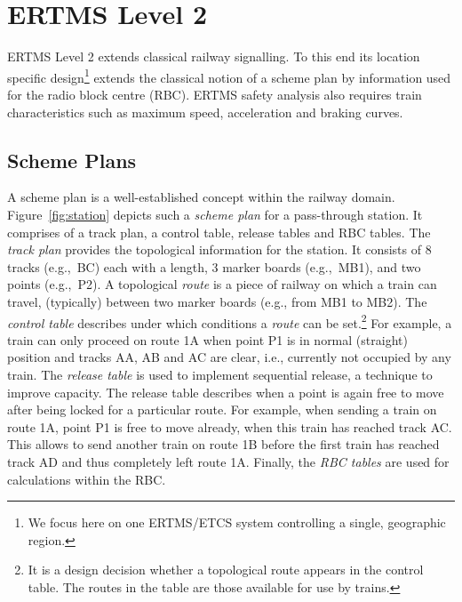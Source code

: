 \section{ERTMS Level 2}


ERTMS Level 2 extends classical railway signalling. To this end its
location specific design\footnote{We focus here on one ERTMS/ETCS
  system controlling a single, geographic region.} extends the
classical notion of a scheme plan by information used for the radio
block centre (RBC). ERTMS safety analysis also requires train
characteristics such as maximum speed, acceleration and braking
curves.

\subsection{Scheme Plans}

A scheme plan is a well-established concept within the railway
domain. Figure~\ref{fig:station} depicts such a \emph{scheme plan} for
a pass-through station. It comprises of a track plan, a control table,
release tables and RBC tables. The \emph{track plan} provides the
topological information for the station. It consists of 8 tracks
(e.g.,\ BC) each with a length, 3 marker boards (e.g.,\ MB1), and two
points (e.g.,\ P2). A topological \emph{route} is a piece of railway
on which a train can travel, (typically) between two marker boards
(e.g., from MB1 to MB2). The {\em control table} describes under which
conditions a \emph{route} can be set.\footnote{It is a design
  decision whether a topological route appears in the control table. The
  routes in the table are those available for use by trains.}  For
example, a train can only proceed on route 1A when point P1 is in
normal (straight) position and tracks AA, AB and AC are clear, i.e.,
currently not occupied by any train. The \emph{release table} is used
to implement sequential release, a technique to improve
capacity. The release table describes when a point is again free to move
after being locked for a particular route. For example, when sending a
train on route 1A, point P1 is free to move already, when this train
has reached track AC. This allows to send another train on route 1B
before the first train has reached track AD and thus completely left
route 1A. Finally, the \emph{RBC tables} are used for %
calculations within the RBC.

